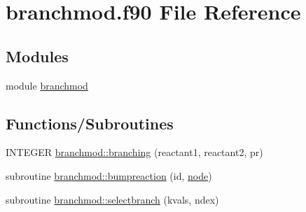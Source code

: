 \hypertarget{branchmod_8f90}{
\section{branchmod.f90 File Reference}
\label{branchmod_8f90}
}
\subsection*{Modules}
\begin{DoxyCompactItemize}
\item 
module \hyperlink{namespacebranchmod}{branchmod}
\end{DoxyCompactItemize}
\subsection*{Functions/Subroutines}
\begin{DoxyCompactItemize}
\item 
INTEGER \hyperlink{namespacebranchmod_afe047e9cf349dd7beea43ce0113ab24b}{branchmod::branching} (reactant1, reactant2, pr)
\item 
subroutine \hyperlink{namespacebranchmod_a37435a321ae1297821d708a3891bdf0d}{branchmod::bumpreaction} (id, \hyperlink{typetypedefs_1_1node}{node})
\item 
subroutine \hyperlink{namespacebranchmod_a4c2d31e67892bffa2413995834db274a}{branchmod::selectbranch} (kvals, ndex)
\end{DoxyCompactItemize}
